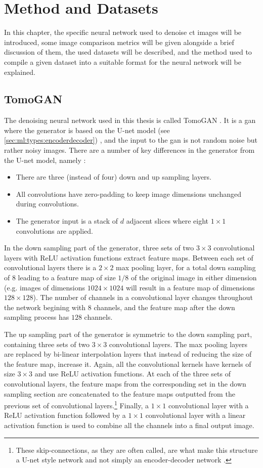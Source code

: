 \chapter{Method and Datasets}
\label{sec:method}
In this chapter, the specific neural network used to denoise \gls{ct} images will be introduced, some image comparison metrics will be given alongside a brief discussion of them, the used datasets will be described, and the method used to compile a given dataset into a suitable format for the neural network will be explained. 


\section{TomoGAN}
\label{sec:method:tomogan}
The denoising neural network used in this thesis is called TomoGAN \cite{liu2020tomogan}. It is a \gls{gan} where the generator is based on the U-net model (see \cref{sec:ml:types:encoderdecoder}) \cite{unet}, and the input to the \gls{gan} is not random noise but rather noisy images. There are a number of key differences in the generator from the U-net model, namely \cite{liu2020tomogan}:
\begin{itemize}
    \item There are three (instead of four) down and up sampling layers.
    \item All convolutions have zero-padding to keep image dimensions unchanged during convolutions.
    \item The generator input is a stack of $d$ adjacent slices where eight $1\times1$ convolutions are applied. 
\end{itemize}
In the down sampling part of the generator, three sets of two $3\times3$ convolutional layers with ReLU activation functions extract feature maps. Between each set of convolutional layers there is a $2\times2$ max pooling layer, for a total down sampling of $8$ leading to a feature map of size $1/8$ of the original image in either dimension (e.g. images of dimensions $1024\times1024$ will result in a feature map of dimensions $128\times128$). The number of channels in a convolutional layer changes throughout the network begining with $8$ channels, and the feature map after the down sampling process has $128$ channels. 

The up sampling part of the generator is symmetric to the down sampling part, containing three sets of two $3\times3$ convolutional layers. The max pooling layers are replaced by bi-linear interpolation layers that instead of reducing the size of the feature map, increase it. Again, all the convolutional kernels have kernels of size $3\times3$ and use ReLU activation functions. At each of the three sets of convolutional layers, the feature maps from the corresponding set in the down sampling section are concatenated to the feature maps outputted from the previous set of convolutional layers.\footnote{These skip-connections, as they are often called, are what make this structure a U-net style network and not simply an encoder-decoder network \cite{unet}. } Finally, a $1\times1$ convolutional layer with a ReLU activation function followed by a $1\times1$ convolutional layer with a linear activation function is used to combine all the channels into a final output image. 

